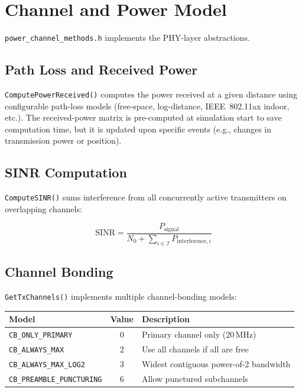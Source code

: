 \documentclass[11pt,a4paper]{article}
\begin{document}
\section{Channel and Power Model}
\label{sec:channel}

\texttt{power\_channel\_methods.h} implements the PHY-layer abstractions.

\subsection{Path Loss and Received Power}

\texttt{ComputePowerReceived()} computes the power received at a given distance using configurable path-loss models (free-space, log-distance, IEEE~802.11ax indoor, etc.).  The received-power matrix is pre-computed at simulation start to save computation time, but it is updated upon specific events (e.g., changes in transmission power or position).

\subsection{SINR Computation}

\texttt{ComputeSINR()} sums interference from all concurrently active transmitters on overlapping channels:

\[
  \text{SINR} = \frac{P_{\text{signal}}}{N_0 + \sum_{i \in \mathcal{I}} P_{\text{interference},i}}
\]

\subsection{Channel Bonding}

\texttt{GetTxChannels()} implements multiple channel-bonding models:

\begin{longtable}{l c p{6.5cm}}
\toprule
\textbf{Model} & \textbf{Value} & \textbf{Description} \\
\midrule
\texttt{CB\_ONLY\_PRIMARY}        & 0 & Primary channel only (20\,MHz) \\
\texttt{CB\_ALWAYS\_MAX}          & 2 & Use all channels if all are free \\
\texttt{CB\_ALWAYS\_MAX\_LOG2}    & 3 & Widest contiguous power-of-2 bandwidth \\
\texttt{CB\_PREAMBLE\_PUNCTURING} & 6 & Allow punctured subchannels \\
\bottomrule
\end{longtable}
\end{document}
